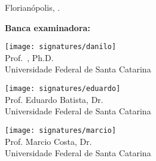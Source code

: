 \thispagestyle{empty}

\begin{center}
  \theauthor
\end{center}

\medskip
\begin{center}
  \textbf{\MakeUppercase{\thetitle}}
\end{center}

\medskip
{}

\begin{center}
  Florianópolis, \thedate.
\end{center}

\medskip
\begin{center}
  \textbf{Banca examinadora:}
\end{center}
\bigskip

 
\begin{center}
  \texttt{[image: signatures/danilo]}\\
  Prof.\ \theadvisor, Ph.D.\\
  {\footnotesize Universidade Federal de Santa Catarina}
\end{center}
\bigskip
\begin{center}
  \texttt{[image: signatures/eduardo]}\\
  Prof. Eduardo Batista, Dr.\\
  {\footnotesize Universidade Federal de Santa Catarina}
\end{center}
\bigskip
\begin{center}
  \texttt{[image: signatures/marcio]}\\
  Prof. Marcio Costa, Dr.\\
  {\footnotesize Universidade Federal de Santa Catarina}
\end{center}


